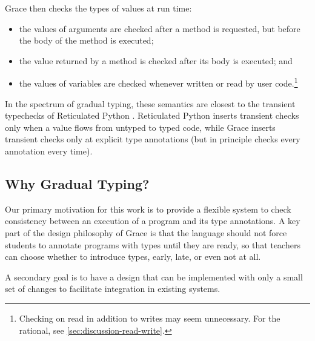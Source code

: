 Grace then checks the types of values at run time:
%
\begin{itemize}
\item the values of arguments are checked after a method is requested, 
      but before the body of the method is executed;
\item the value returned by a method is checked after its body is executed; and
\item the values of variables are checked
      whenever written or read by user code.\footnote{
        Checking on read in addition to writes may seem unnecessary.
        For the rational, see \cref{sec:discussion-read-write}.}
\end{itemize}
%
%
%
%
In the spectrum of gradual typing, these semantics are
closest to the
transient typechecks of Reticulated Python
\cite{reticPython2014,Greenman2018}.
Reticulated Python inserts transient checks only when a value flows from untyped
to typed code, while Grace inserts transient checks only at explicit type
annotations (but in principle checks every annotation every time).



\subsection{Why Gradual Typing?}


Our primary motivation for this work
is to provide a flexible system 
to check consistency between an execution of a program
and its type annotations.
 A key part of the design philosophy of Grace is that the language should not force
 students to annotate programs with types until they are ready, so that
 teachers can choose whether to introduce types, early, late, or even
 not at all. 

A secondary goal is to have a design that can be implemented with
only a small set of changes to facilitate integration in existing systems.


